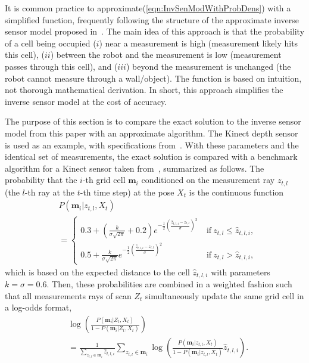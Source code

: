 \documentclass[letterpaper, 10pt, conference]{ieeeconf}
\newcommand{\refeqn}[1]{(\ref{eqn:#1})}
\begin{document}
 It is common practice to approximate\refeqn{InvSenModWithProbDens} with a simplified function, frequently following the structure of the approximate inverse sensor model proposed in~\cite{And09}.
The main idea of this approach is that the probability of a cell being occupied ($i$) near a measurement is high (measurement likely hits this cell), ($ii$) between the robot and the measurement is low (measurement passes through this cell), and ($iii$) beyond the measurement is unchanged (the robot cannot measure through a wall/object).
The function is based on intuition, not thorough mathematical derivation.
In short, this approach simplifies the inverse sensor model at the cost of accuracy.

The purpose of this section is to compare the exact solution to the inverse sensor model from this paper with an approximate algorithm.
The Kinect depth sensor is used as an example, with specifications from~\cite{KhoElb12}.
With these parameters and the identical set of measurements, the exact solution is compared with a benchmark algorithm for a Kinect sensor taken from~\cite{PirRutBisSch11}, summarized as follows.
The probability that the $i$-th grid cell $\mathbf{m}_i$ conditioned on the measurement ray $z_{t,l}$ (the $l$-th ray at the $t$-th time step) at the pose $X_t$ is the continuous function
\begin{align}
\label{eqn:ISM_Approx_1}
&P(\mathbf{m}_i|z_{t,l},X_t)\nonumber\\&=\begin{cases}
0.3+(\frac{k}{\sigma\sqrt{2\pi}}+0.2)e^{-\frac12\left(\frac{\hat z_{t,l,i}-z_{t,l}}{\sigma}\right)^2}\ &\text{if}\ z_{t,l}\leq \hat z_{t,l,i},
\\
0.5+\frac{k}{\sigma\sqrt{2\pi}}e^{-\frac12\left(\frac{\hat z_{t,l,i}-z_{t,l}}{\sigma}\right)^2}\ &\text{if}\ z_{t,l}>\hat z_{t,l,i},
\end{cases}
\end{align}
which is based on the expected distance to the cell $\hat z_{t,l,i}$ with parameters $k=\sigma=0.6$. Then, these probabilities are combined in a weighted fashion such that all measurements rays of scan $Z_t$ simultaneously update the same grid cell in a log-odds format,
\begin{align}
\label{eqn:ISM_Approx_2}
&\log\left(\frac{P(\mathbf{m}_i|Z_{t},X_t)}{1-P(\mathbf{m}_i|Z_{t},X_t)}\right)
\nonumber\\&=
\frac1{\sum_{z_{t,l}\in\mathbf{m}_i}\hat z_{t,l,i}}\sum_{z_{t,l}\in\mathbf{m}_i}\log\left(\frac{P(\mathbf{m}_i|z_{t,l},X_t)}{1-P(\mathbf{m}_i|z_{t,l},X_t)}\hat z_{t,l,i}\right).
\end{align}
\end{document}
